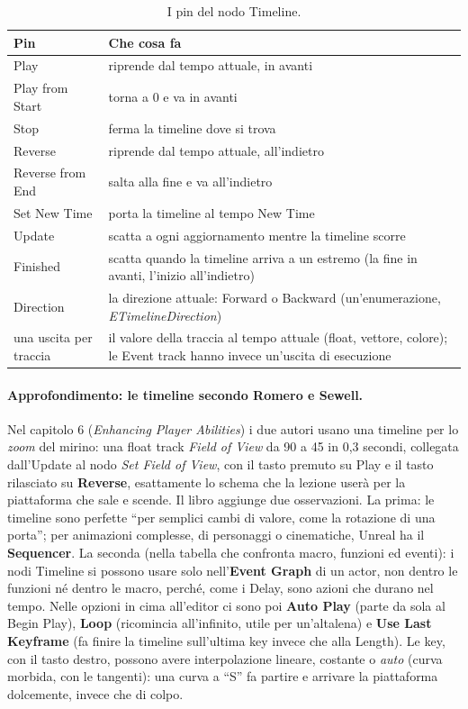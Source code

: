 \begin{table}[htbp]
\centering
\small
\begin{tabular}{@{}p{3.4cm}p{10.6cm}@{}}
\toprule
\textbf{Pin} & \textbf{Che cosa fa} \\
\midrule
Play & riprende dal tempo attuale, in avanti \\
Play from Start & torna a 0 e va in avanti \\
Stop & ferma la timeline dove si trova \\
Reverse & riprende dal tempo attuale, all'indietro \\
Reverse from End & salta alla fine e va all'indietro \\
Set New Time & porta la timeline al tempo New Time \\
\midrule
Update & scatta a ogni aggiornamento mentre la timeline scorre \\
Finished & scatta quando la timeline arriva a un estremo (la fine in avanti, l'inizio
all'indietro) \\
Direction & la direzione attuale: Forward o Backward (un'enumerazione,
\emph{ETimelineDirection}) \\
una uscita per traccia & il valore della traccia al tempo attuale (float, vettore,
colore); le Event track hanno invece un'uscita di esecuzione \\
\bottomrule
\end{tabular}
\caption{I pin del nodo Timeline.}
\label{ue6:tab:timeline}
\end{table}

\paragraph{Approfondimento: le timeline secondo Romero e Sewell.} Nel capitolo 6
(\emph{Enhancing Player Abilities}) i due autori usano una timeline per lo
\emph{zoom} del mirino: una float track \emph{Field of View} da 90 a 45 in 0,3 secondi,
collegata dall'Update al nodo \emph{Set Field of View}, con il tasto premuto su Play e il
tasto rilasciato su \textbf{Reverse}, esattamente lo schema che la lezione userà per la
piattaforma che sale e scende. Il libro aggiunge due osservazioni. La prima: le timeline
sono perfette ``per semplici cambi di valore, come la rotazione di una porta''; per
animazioni complesse, di personaggi o cinematiche, Unreal ha il \textbf{Sequencer}. La
seconda (nella tabella che confronta macro, funzioni ed eventi): i nodi Timeline si
possono usare solo nell'\textbf{Event Graph} di un actor, non dentro le funzioni né
dentro le macro, perché, come i Delay, sono azioni che durano nel tempo. Nelle opzioni
in cima all'editor ci sono poi \textbf{Auto Play} (parte da sola al Begin Play),
\textbf{Loop} (ricomincia all'infinito, utile per un'altalena) e \textbf{Use Last
Keyframe} (fa finire la timeline sull'ultima key invece che alla Length). Le key, con il
tasto destro, possono avere interpolazione lineare, costante o \emph{auto} (curva
morbida, con le tangenti): una curva a ``S'' fa partire e arrivare la piattaforma
dolcemente, invece che di colpo.

